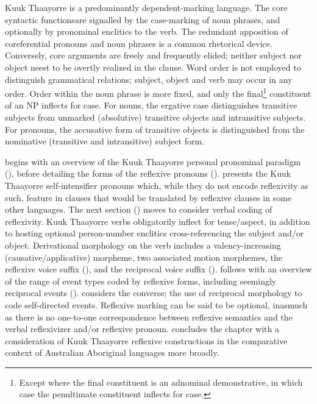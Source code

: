 \documentclass[output=paper]{langscibook}
\begin{document}
Kuuk Thaayorre is a predominantly dependent-marking language. The core syntactic functionsare signalled by the case-marking of noun phrases, and optionally by pronominal enclitics to the verb. The redundant apposition of coreferential pronouns and noun phrases is a common rhetorical device. Conversely, core arguments are freely and frequently elided; neither subject nor object neest to be overtly realized in the clause. Word order is not employed to distinguish grammatical relations; subject, object and verb may occur in any order. Order within the noun phrase is more fixed, and only the final\footnote{Except where the final constituent is an adnominal demonstrative, in which case the penultimate constituent inflects for case.} constituent of an NP inflects for case. For nouns, the ergative case distinguishes transitive subjects from unmarked (absolutive) transitive objects and intransitive subjects. For pronouns, the accusative form of transitive objects is distinguished from the nominative (transitive and intransitive) subject form. 

 begins with an overview of the Kuuk Thaayorre personal pronominal paradigm (), before detailing the forms of the reflexive pronouns ().  presents the Kuuk Thaayorre self-intensifier pronouns which, while they do not encode reflexivity as such, feature in clauses that would be translated by reflexive clauses in some other languages. The next section () moves to consider verbal coding of reflexivity. Kuuk Thaayorre verbs obligatorily inflect for tense/aspect, in addition to hosting optional person-number enclitics cross-referencing the subject and/or object. Derivational morphology on the verb includes a valency-increasing (causative/applicative) morpheme, two associated motion morphemes, the reflexive voice suffix (), and the reciprocal voice suffix ().  follows with an overview of the range of event types coded by reflexive forms, including seemingly reciprocal events ().  considers the converse; the use of reciprocal morphology to code self-directed events. Reflexive marking can be said to be optional, inasmuch as there is no one-to-one correspondence between reflexive semantics and the verbal reflexivizer and/or reflexive pronoun.  concludes the chapter with a consideration of Kuuk Thaayorre reflexive constructions in the comparative context of Australian Aboriginal languages more broadly.
\end{document}

